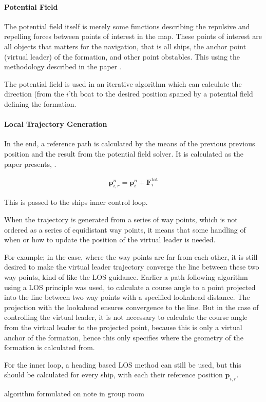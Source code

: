 \paragraph{Potential Field}
The potential field itself is merely some functions describing the
repulsive and repelling forces between points of interest in the map.
These points of interest are all objects that matters for the
navigation, that is all ships, the anchor point (virtual leader) of
the formation, and other point obstables. This using the methodology
described in the paper \citep{UAVff3dpf}.

The potential field is used in an iterative algorithm which can
calculate the direction (from the $i$'th boat to the desired position
spaned by a potential field defining the formation.

\paragraph{Local Trajectory Generation}
In the end, a reference path is calculated by the means of the
previous previous position and the result from the potential field
solver. It is calculated as the paper presents, \citep[eq.
48]{UAVff3dpf}.

\begin{align}
	\mathbf{p}_{i,r}^n = \mathbf{p}_i^n + \mathbf{F}_i ^\text{tot}
\end{align}

This is passed to the ships inner control loop.

When the trajectory is generated from a series of way points, which is
not ordered as a series of equidistant way points, it means that some
handling of when or how to update the position of the virtual leader
is needed.

For example; in the case, where the way points are far from each
other, it is still desired to make the virtual leader trajectory
converge the line between these two way points, kind of like the
\ac{LOS} guidance. Earlier a path following algorithm using a \ac{LOS}
principle was used, to calculate a course angle to a point projected
into the line between two way points with a specified lookahead
distance. The projection with the lookahead ensures convergence to the
line. But in the case of controlling the virtual leader, it is not
necessary to calculate the course angle from the virtual leader to the
projected point, because this is only a virtual anchor of the
formation, hence this only specifies where the geometry of the
formation is calculated from. 

For the inner loop, a heading based \ac{LOS} method can still be used,
but this should be calculated for every ship, with each their
reference position $\mathbf{p}_{i,r}$.


algorithm formulated on note in group room



